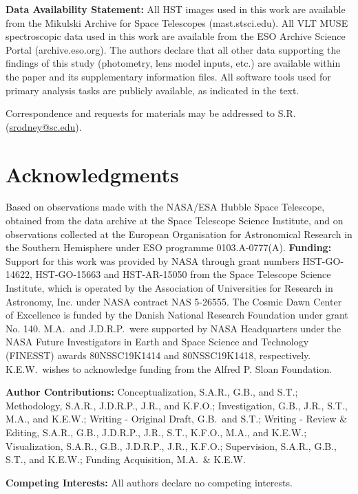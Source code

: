 \documentclass[12pt]{article}
\begin{document}
\clearpage



%


{\bf Data Availability Statement:} All HST images used in this work are available from the Mikulski Archive for Space Telescopes (mast.stsci.edu). All VLT MUSE spectroscopic data used in this work are available from  the ESO Archive Science Portal (archive.eso.org). The authors declare that all other data supporting the findings of this study (photometry, lens model inputs, etc.) are available within the paper and its supplementary information files.  All software tools used for primary analysis tasks are publicly available, as indicated in the text.


Correspondence and requests for materials may be addressed to S.R. (\href{mailto:srodney@sc.edu}{srodney@sc.edu}).

\section*{Acknowledgments}

Based on observations made with the NASA/ESA Hubble Space Telescope, obtained from the data archive at the Space Telescope Science Institute, and on observations collected at the European Organisation for Astronomical Research in the Southern Hemisphere under ESO programme 0103.A-0777(A).  
{\bf Funding:} Support for this work was provided by NASA through grant numbers HST-GO-14622, HST-GO-15663 and HST-AR-15050 from the Space Telescope Science Institute, which is operated by the Association of Universities for Research in Astronomy, Inc. under NASA contract NAS 5-26555.  The Cosmic Dawn Center of Excellence is funded by the Danish National Research Foundation under grant No. 140. M.A.\ and J.D.R.P.\ were supported by NASA Headquarters under the NASA Future Investigators in Earth and Space Science and Technology (FINESST) awards 80NSSC19K1414 and 80NSSC19K1418, respectively.  K.E.W.\ wishes to acknowledge funding from the Alfred P. Sloan Foundation. 

{\bf Author Contributions:} 
Conceptualization, S.A.R., G.B., and S.T.; Methodology, S.A.R., J.D.R.P., J.R., and K.F.O.; Investigation, G.B., J.R., S.T., M.A., and K.E.W.; Writing - Original Draft, G.B.\ and S.T.; Writing - Review \& Editing, S.A.R., G.B., J.D.R.P., J.R., S.T., K.F.O., M.A., and K.E.W.; Visualization, S.A.R., G.B., J.D.R.P., J.R., K.F.O.; Supervision, S.A.R., G.B., S.T., and K.E.W.; Funding Acquisition, M.A.\ \& K.E.W.

{\bf Competing Interests:} All authors declare no competing interests.
\end{document}
